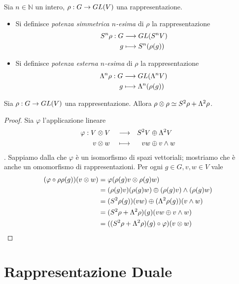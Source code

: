 \begin{definition}
Sia $n\in\mathbb{N}$ un intero, $\rho:G\to GL(V)$ una rappresentazione.
\begin{itemize}
\item Si definisce \emph{potenza simmetrica $n$-esima} di $\rho$ la rappresentazione
\begin{align*}
S^n\rho:G&\longrightarrow GL(S^nV)\\
g&\longmapsto S^n(\rho(g))
\end{align*}
\item Si definisce \emph{potenza esterna $n$-esima} di $\rho$ la rappresentazione
\begin{align*}
\Lambda^n\rho:G&\longrightarrow GL(\Lambda^nV)\\
g&\longmapsto\Lambda^n(\rho(g))
\end{align*}
\end{itemize}
\end{definition}

\begin{proposition}
Sia $\rho:G\to GL(V)$ una rappresentazione. Allora $\rho\otimes\rho\simeq S^2\rho+\Lambda^2\rho$.
\end{proposition}
\begin{proof}
Sia $\varphi$ l'applicazione lineare
\begin{alignat*}{3}
\varphi:V&\otimes V&&\longrightarrow&S^2V&\oplus\Lambda^2V\\
v&\otimes w&&\longmapsto& vw&\oplus v\wedge w
\end{alignat*}
. Sappiamo dalla  che $\varphi$ è un isomorfismo di spazi vettoriali; mostriamo che è anche un omomorfismo di rappresentazioni. Per ogni $g\in G\comma v, w\in V$ vale
\begin{align*}
(\varphi\circ\rho\rho(g))(v\otimes w)&=\varphi(\rho(g)v\otimes\rho(g)w)\\
&=(\rho(g)v)(\rho(g)w)\oplus(\rho(g)v)\wedge(\rho(g)w)\\
&=(S^2\rho(g))(vw)\oplus(\Lambda^2\rho(g))(v\wedge w)\\
&=(S^2\rho+\Lambda^2\rho)(g)(vw\oplus v\wedge w)\\
&=((S^2\rho+\Lambda^2\rho)(g)\circ\varphi)(v\otimes w)
\end{align*}
\end{proof}


\section{Rappresentazione Duale}

